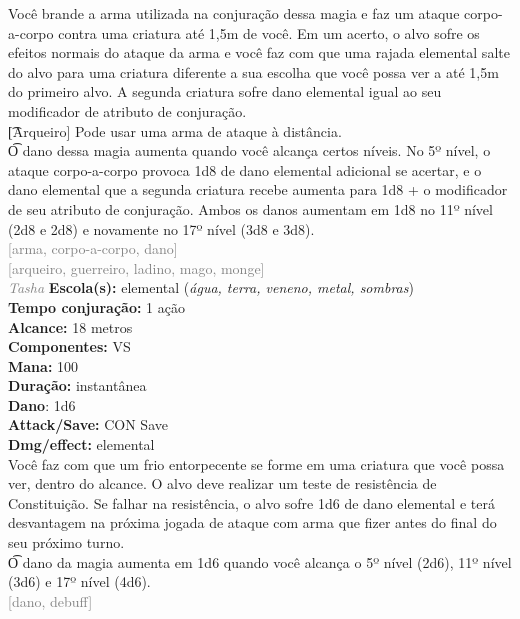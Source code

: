 \documentclass{RPG_Adventure}[2021/10/20]
\begin{document}
{\normalsize Você brande a arma utilizada na conjuração dessa magia e faz um ataque corpo-a-corpo contra uma criatura até 1,5m de você. Em um acerto, o alvo sofre os efeitos normais do ataque da arma e você faz com que uma rajada elemental salte do alvo para uma criatura diferente a sua escolha que você possa ver a até 1,5m do primeiro alvo. A segunda criatura sofre dano elemental igual ao seu modificador de atributo de conjuração.\\\t [Arqueiro] Pode usar uma arma de ataque à distância.\\\t O dano dessa magia aumenta quando você alcança certos níveis. No 5º nível, o ataque corpo-a-corpo provoca 1d8 de dano elemental adicional se acertar, e o dano elemental que a segunda criatura recebe aumenta para 1d8 + o modificador de seu atributo de conjuração. Ambos os danos aumentam em 1d8 no 11º nível (2d8 e 2d8) e novamente no 17º nível (3d8 e 3d8).\\}
{\scriptsize \textcolor{gray}{[arma, corpo-a-corpo, dano]\\}}
{\scriptsize \textcolor{gray}{[arqueiro, guerreiro, ladino, mago, monge]\\}}
{\tiny \textcolor{gray}{\textit{Tasha}}}\jump{}
{\small \t \textbf{Escola(s):} elemental (\textit{água, terra, veneno, metal, sombras})\\\t \textbf{Tempo conjuração:} 1 ação\\\t \textbf{Alcance:} 18 metros\\\t \textbf{Componentes:} VS\\\t \textbf{Mana:} 100\\\t \textbf{Duração:} instantânea\\\t \textbf{Dano}: 1d6\\\t \textbf{Attack/Save:} CON Save\\\t \textbf{Dmg/effect:} elemental\\}
{\normalsize Você faz com que um frio entorpecente se forme em uma criatura que você possa ver, dentro do alcance. O alvo deve realizar um teste de resistência de Constituição. Se falhar na resistência, o alvo sofre 1d6 de dano elemental e terá desvantagem na próxima jogada de ataque com arma que fizer antes do final do seu próximo turno.\\\t O dano da magia aumenta em 1d6 quando você alcança o 5º nível (2d6), 11º nível (3d6) e 17º nível (4d6).\\}
{\scriptsize \textcolor{gray}{[dano, debuff]\\}}
\end{document}
